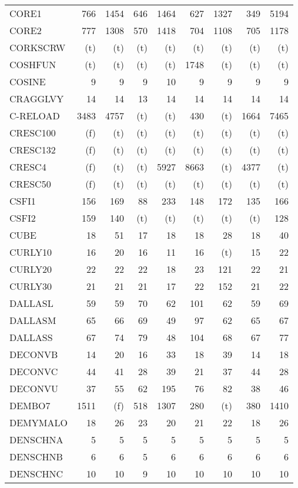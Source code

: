 \documentclass[11pt,twoside]{article}
\begin{document}
{\begin{longtable}[c]{|l|r|r|r|r|r|r|r|r|}
 CORE1 & 766 & 1454 & 646 & 1464 & 627 & 1327 & 349 & 5194 \\
 CORE2 & 777 & 1308 & 570 & 1418 & 704 & 1108 & 705 & 1178 \\
 CORKSCRW & (t) & (t) & (t) & (t) & (t) & (t) & (t) & (t) \\
 COSHFUN & (t) & (t) & (t) & (t) & 1748 & (t) & (t) & (t) \\
 COSINE & 9 & 9 & 9 & 10 & 9 & 9 & 9 & 9 \\
 CRAGGLVY & 14 & 14 & 13 & 14 & 14 & 14 & 14 & 14 \\
 C-RELOAD & 3483 & 4757 & (t) & (t) & 430 & (t) & 1664 & 7465 \\
 CRESC100 & (f) & (t) & (t) & (t) & (t) & (t) & (t) & (t) \\
 CRESC132 & (f) & (t) & (t) & (t) & (t) & (t) & (t) & (t) \\
 CRESC4 & (f) & (t) & (t) & 5927 & 8663 & (t) & 4377 & (t) \\
 CRESC50 & (f) & (t) & (t) & (t) & (t) & (t) & (t) & (t) \\
 CSFI1 & 156 & 169 & 88 & 233 & 148 & 172 & 135 & 166 \\
 CSFI2 & 159 & 140 & (t) & (t) & (t) & (t) & (t) & 128 \\
 CUBE & 18 & 51 & 17 & 18 & 18 & 28 & 18 & 40 \\
 CURLY10 & 16 & 20 & 16 & 11 & 16 & (t) & 15 & 22 \\
 CURLY20 & 22 & 22 & 22 & 18 & 23 & 121 & 22 & 21 \\
 CURLY30 & 21 & 21 & 21 & 17 & 22 & 152 & 21 & 22 \\
 DALLASL & 59 & 59 & 70 & 62 & 101 & 62 & 59 & 69 \\
 DALLASM & 65 & 66 & 69 & 49 & 97 & 62 & 65 & 67 \\
 DALLASS & 67 & 74 & 79 & 48 & 104 & 68 & 67 & 77 \\
 DECONVB & 14 & 20 & 16 & 33 & 18 & 39 & 14 & 18 \\
 DECONVC & 44 & 41 & 28 & 39 & 21 & 37 & 44 & 28 \\
 DECONVU & 37 & 55 & 62 & 195 & 76 & 82 & 38 & 46 \\
 DEMBO7 & 1511 & (f) & 518 & 1307 & 280 & (t) & 380 & 1410 \\
 DEMYMALO & 18 & 26 & 23 & 20 & 21 & 22 & 18 & 26 \\
 DENSCHNA & 5 & 5 & 5 & 5 & 5 & 5 & 5 & 5 \\
 DENSCHNB & 6 & 6 & 5 & 6 & 6 & 6 & 6 & 6 \\
 DENSCHNC & 10 & 10 & 9 & 10 & 10 & 10 & 10 & 10 \\

\end{longtable}}
\end{document}
